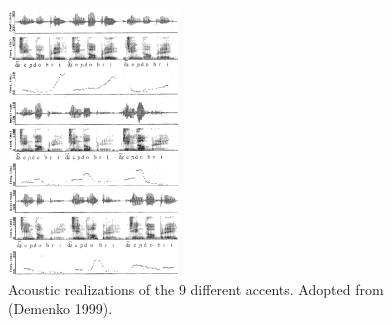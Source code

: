 \documentclass[a4paper,9pt]{beamer}
\theoremstyle{mytheoremstyle}
\begin{document}
\begin{frame}
\begin{figure}
\begin{center}
  \includegraphics[width=0.4\textwidth]{res/tonal_accents}
\end{center}
	\caption{Acoustic realizations of the 9 different accents. Adopted from (Demenko 1999).}
\end{figure}
\end{frame}
\end{document}
